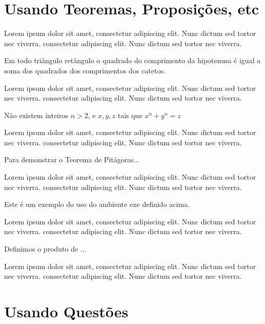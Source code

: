 \lipsum[11]

\section{Usando Teoremas, Proposições, etc}

Lorem ipsum dolor sit amet, consectetur adipiscing elit. Nunc dictum sed tortor nec viverra. consectetur adipiscing elit. Nunc dictum sed tortor nec viverra.

\begin{teo}[Pitágoras]
	Em todo triângulo retângulo o quadrado do comprimento da
	hipotenusa é igual a soma dos quadrados dos comprimentos dos catetos.
\end{teo}


Lorem ipsum dolor sit amet, consectetur adipiscing elit. Nunc dictum sed tortor nec viverra. consectetur adipiscing elit. Nunc dictum sed tortor nec viverra.

\begin{teo}[Fermat]
	Não existem inteiros $n > 2$, e $x, y, z$ tais que $x^n + y^n = z$
\end{teo}

Lorem ipsum dolor sit amet, consectetur adipiscing elit. Nunc dictum sed tortor nec viverra. consectetur adipiscing elit. Nunc dictum sed tortor nec viverra.

\begin{prop}
	Para demonstrar o Teorema de Pitágoras...
\end{prop}

Lorem ipsum dolor sit amet, consectetur adipiscing elit. Nunc dictum sed tortor nec viverra. consectetur adipiscing elit. Nunc dictum sed tortor nec viverra.

\begin{exem}
	Este é um exemplo do uso do ambiente exe definido acima.
\end{exem}

Lorem ipsum dolor sit amet, consectetur adipiscing elit. Nunc dictum sed tortor nec viverra. consectetur adipiscing elit. Nunc dictum sed tortor nec viverra.

\begin{xdefinicao}
	Definimos o produto de ...
\end{xdefinicao}

Lorem ipsum dolor sit amet, consectetur adipiscing elit. Nunc dictum sed tortor nec viverra. consectetur adipiscing elit. Nunc dictum sed tortor nec viverra.

\section{Usando Questões}


